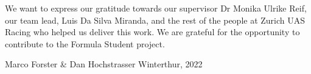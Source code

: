 We want to express our gratitude towards our supervisor Dr Monika Ulrike Reif, our team lead, Luis Da Silva Miranda, and the rest of the people at Zurich UAS Racing who helped us deliver this work. We are grateful for the opportunity to contribute to the Formula Student project.

Marco Forster \& Dan Hochstrasser \newline
Winterthur, 2022
